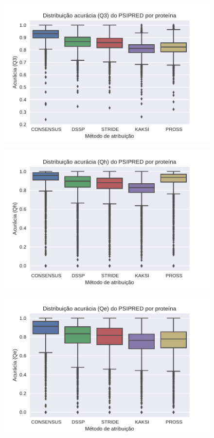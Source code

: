 \begin{figure}
    \includegraphics[width=\linewidth]{../figures/psipred_q3.pdf}
    \caption{}
    \label{fig:psipred_q3}
\end{figure}

\begin{figure}
    \includegraphics[width=\linewidth]{../figures/psipred_qh.pdf}
    \caption{}
    \label{fig:psipred_qh}
\end{figure}

\begin{figure}
    \includegraphics[width=\linewidth]{../figures/psipred_qe.pdf}
    \caption{}
    \label{fig:psipred_qe}
\end{figure}

